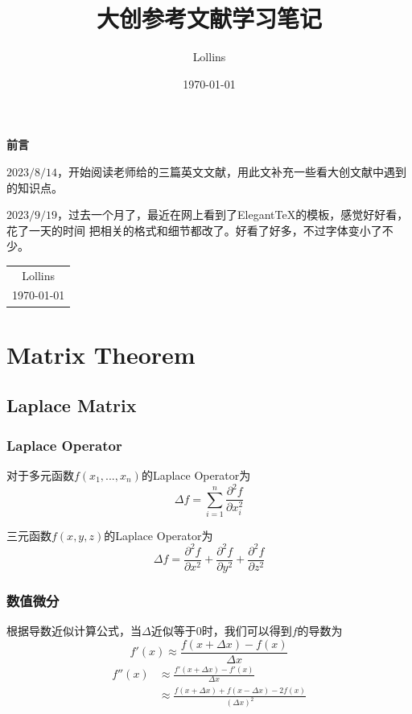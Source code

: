 \documentclass[lang=cn,10pt]{elegantbook}
\title{大创参考文献学习笔记}
\author{Lollins}
\date{\today}
\begin{document}
\maketitle

\begin{center}
	\Huge\textbf{前言}
\end{center}
\par
$2023/8/14$，开始阅读老师给的三篇英文文献，用此文补充一些看大创文献中遇到的知识点。

$2023/9/19$，过去一个月了，最近在网上看到了Elegant\TeX 的模板，感觉好好看，花了一天的时间
把相关的格式和细节都改了。好看了好多，不过字体变小了不少。

\begin{flushright}
	\begin{tabular}{c}
		Lollins \\
		\today
	\end{tabular}
\end{flushright}

\newpage
{}
\setcounter{page}{1}
\tableofcontents
\newpage
\setcounter{page}{1}

\chapter{Matrix Theorem}

\section{Laplace Matrix}
\subsection*{Laplace Operator}
\par 对于多元函数$f(x_1,...,x_n)$的Laplace Operator为
\begin{equation}
	\Delta f=\sum_{i=1}^n\frac{\partial^2f}{\partial x_i^2}
\end{equation}
\begin{example}
	三元函数$f(x,y,z)$的Laplace Operator为
	$$
		\Delta f=\frac{\partial^2f}{\partial x^2} + \frac{\partial^2f}{\partial y^2} + \frac{\partial^2f}{\partial z^2}
	$$
\end{example}

\subsection*{数值微分}
\par 根据导数近似计算公式，当$\Delta$近似等于$0$时，我们可以得到$f$的导数为
\begin{equation*}
	f'(x)\approx \frac{f(x+\Delta x) - f(x)}{\Delta x}
\end{equation*}
\begin{equation*}
	\begin{aligned}
		f''(x) & \approx \frac{f'(x+\Delta x) - f'(x)}{\Delta x}                    \\
		       & \approx \frac{f(x+\Delta x) + f(x-\Delta x) - 2f(x)}{(\Delta x)^2}
	\end{aligned}
\end{equation*}
\end{document}
